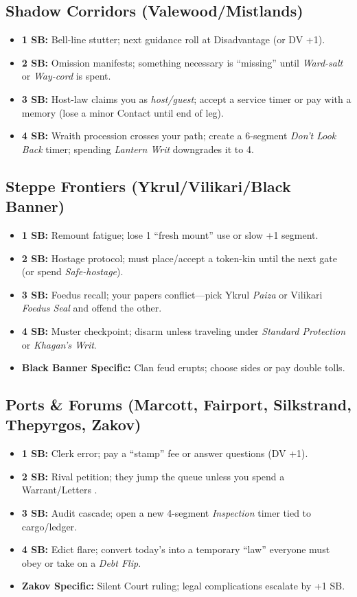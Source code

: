\documentclass[11pt,letterpaper,twoside]{book}
\begin{document}
\subsection{Shadow Corridors (Valewood/Mistlands)}
\begin{itemize}
  \item \textbf{1 SB:} Bell-line stutter; next guidance roll at Disadvantage (or DV +1).
  \item \textbf{2 SB:} Omission manifests; something necessary is ``missing'' until \emph{Ward-salt} or \emph{Way-cord} is spent.
  \item \textbf{3 SB:} Host-law claims you as \emph{host/guest}; accept a service timer or pay with a memory (lose a minor Contact until end of leg).
  \item \textbf{4 SB:} Wraith procession crosses your path; create a 6-segment \emph{Don't Look Back} timer; spending \emph{Lantern Writ} downgrades it to 4.
\end{itemize}

\subsection{Steppe Frontiers (Ykrul/Vilikari/Black Banner)}
\begin{itemize}
  \item \textbf{1 SB:} Remount fatigue; lose 1 ``fresh mount'' use or slow +1 segment.
  \item \textbf{2 SB:} Hostage protocol; must place/accept a token-kin until the next gate (or spend \emph{Safe-hostage}).
  \item \textbf{3 SB:} Foedus recall; your papers conflict---pick Ykrul \emph{Paiza} or Vilikari \emph{Foedus Seal} and offend the other.
  \item \textbf{4 SB:} Muster checkpoint; disarm unless traveling under \emph{Standard Protection} or \emph{Khagan's Writ}.
  \item \textbf{Black Banner Specific:} Clan feud erupts; choose sides or pay double tolls.
\end{itemize}

\subsection{Ports \& Forums (Marcott, Fairport, Silkstrand, Thepyrgos, Zakov)}
\begin{itemize}
  \item \textbf{1 SB:} Clerk error; pay a ``stamp'' fee or answer questions (DV +1).
  \item \textbf{2 SB:} Rival petition; they jump the queue unless you spend a Warrant/Letters \diamondsuit{}.
  \item \textbf{3 SB:} Audit cascade; open a new 4-segment \emph{Inspection} timer tied to cargo/ledger.
  \item \textbf{4 SB:} Edict flare; convert today's \clubsuit{} into a temporary ``law'' everyone must obey or take on a \emph{Debt Flip}.
  \item \textbf{Zakov Specific:} Silent Court ruling; legal complications escalate by +1 SB.
\end{itemize}
\end{document}
